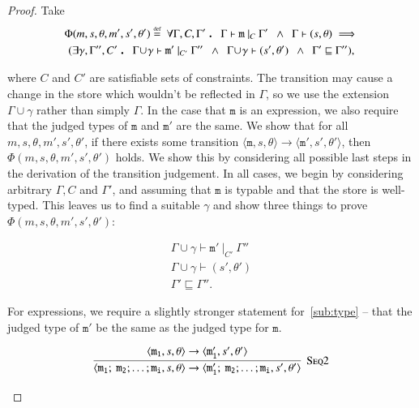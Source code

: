 \documentclass[12pt,a4paper,twoside,openright]{report}
\theoremstyle{definition}
\theoremstyle{dotless}
\newcommand{\transition}[6]{\langle{}\mathtt{#1},#2,#3\rangle{}\rightarrow{}\langle{}\mathtt{#4},#5,#6\rangle}
\newcommand\eqdef{\mathrel{\overset{\makebox[0pt]{\mbox{\normalfont\tiny def}}}{=}}}
\newcommand\qdot{\mathbin{\scalebox{1.5}{.}}\enspace}
\begin{document}
 \begin{proof}
   Take 
   \begin{multline*}
 	\Phi(m, s, \theta, m', s', \theta') \eqdef 
\	\forall\Gamma,C,\Gamma' \qdot
	\Gamma\vdash\mathtt{m}\ |_C\ \Gamma' 
	\enspace\land\enspace\Gamma\vdash (s,\theta)
	\implies \\
   	(\exists\gamma,\Gamma'',C'\qdot
    \Gamma\!\cup\!\gamma\vdash \mathtt{m'}\ |_{C'}\ \Gamma'' 
	\enspace\land\enspace\Gamma\!\cup\!\gamma\vdash (s',\theta')
	\enspace\land\enspace \Gamma'\sqsubseteq\Gamma''),
  \end{multline*} 

  where $C$ and $C'$ are satisfiable sets of constraints. The transition may
  cause a change in the store which wouldn't be reflected in $\Gamma$, so we
  use the extension $\Gamma\!\cup\!\gamma$ rather than simply $\Gamma$. In the
  case that $\mathtt{m}$ is an expression, we also require that the judged
  types of $\mathtt{m}$ and $\mathtt{m'}$ are the same. We show that for all
  $m, s, \theta, m', s', \theta'$, if there exists some transition
  $\transition{m}{s}{\theta}{m'}{s'}{\theta'}$, then
  $\Phi(m,s,\theta,m',s',\theta')$ holds. We show this by considering all
  possible last steps in the derivation of the transition judgement. In all
  cases, we begin by considering arbitrary $\Gamma, C$ and $\Gamma'$, and
  assuming that $\mathtt{m}$ is typable and that the store is well-typed. This leaves us to find
  a suitable $\gamma$ and show three things to prove $\Phi(m,s,\theta,m',s',\theta')$:

  \begin{gather}
	\Gamma\!\cup\!\gamma\vdash\mathtt{m'}\ |_{C'}\ \Gamma'' \label{sub:type}\\
	\Gamma\!\cup\!\gamma\vdash(s',\theta') \label{sub:store} \\
	\Gamma' \sqsubseteq \Gamma'' \label{sub:env}.
  \end{gather}

  For expressions, we require a slightly stronger statement for~\eqref{sub:type} -- that
  the judged type of $\mathtt{m'}$ be the same as the judged type for $\mathtt{m}$.
	
  \begin{case}[Seq2]
	$$\infer[\textsc{Seq2}]{
	  \transition{m_1;\ m_2; \dots; m_i}{s}{\theta}{m_1';\ m_2; \dots; m_i}{s'}{\theta'}
	}{
	 \transition{m_1}{s}{\theta}{m_1'}{s'}{\theta'} 
	}$$


\end{case}
\end{proof}
\end{document}
